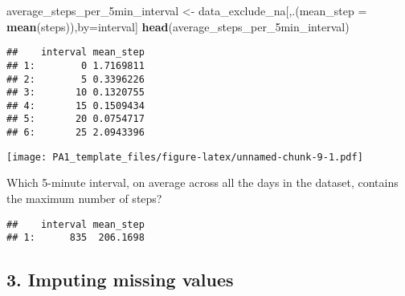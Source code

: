 \documentclass[
]{article}
\newenvironment{Shaded}{\begin{snugshade}}{\end{snugshade}}
\newcommand{\CommentTok}[1]{\textcolor[rgb]{0.56,0.35,0.01}{\textit{#1}}}
\newcommand{\DataTypeTok}[1]{\textcolor[rgb]{0.13,0.29,0.53}{#1}}
\newcommand{\KeywordTok}[1]{\textcolor[rgb]{0.13,0.29,0.53}{\textbf{#1}}}
\newcommand{\NormalTok}[1]{#1}
\newcommand{\OperatorTok}[1]{\textcolor[rgb]{0.81,0.36,0.00}{\textbf{#1}}}
\newcommand{\StringTok}[1]{\textcolor[rgb]{0.31,0.60,0.02}{#1}}
\begin{document}
\begin{Shaded}
\begin{Highlighting}[]
\NormalTok{average_steps_per_5min_interval <-}\StringTok{ }\NormalTok{data_exclude_na[,.(}\DataTypeTok{mean_step =} \KeywordTok{mean}\NormalTok{(steps)),by=interval]}
\KeywordTok{head}\NormalTok{(average_steps_per_5min_interval)}
\end{Highlighting}
\end{Shaded}

\begin{verbatim}
##    interval mean_step
## 1:        0 1.7169811
## 2:        5 0.3396226
## 3:       10 0.1320755
## 4:       15 0.1509434
## 5:       20 0.0754717
## 6:       25 2.0943396
\end{verbatim}

\begin{Shaded}
\end{Shaded}

\texttt{[image: PA1\_template\_files/figure-latex/unnamed-chunk-9-1.pdf]}

Which 5-minute interval, on average across all the days in the dataset,
contains the maximum number of steps?

\begin{Shaded}
\end{Shaded}

\begin{verbatim}
##    interval mean_step
## 1:      835  206.1698
\end{verbatim}

\hypertarget{imputing-missing-values}{%
\subsection{3. Imputing missing values}\label{imputing-missing-values}}
\end{document}
